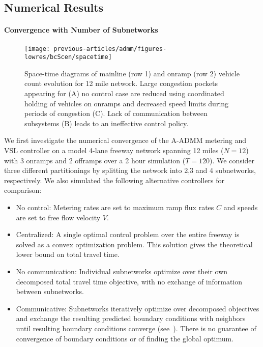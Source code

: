 \subsection{Numerical Results}
\label{sec:numerical_results-admm}

\paragraph{Convergence with Number of Subnetworks}

\begin{figure}[t]
  \centering
  \texttt{[image: previous-articles/admm/figures-lowres/bcScen/spacetime]}
  \caption{Space-time diagrams of mainline (row 1) and onramp (row 2) vehicle count evolution for 12 mile network. Large congestion pockets appearing for (A) no control case are reduced using coordinated holding of vehicles on onramps and decreased speed limits during periods of congestion (C). Lack of communication between subsystems (B) leads to an ineffective control policy.}
  \label{fig:spacetime}
\end{figure}

We first investigate the numerical convergence of the A-ADMM metering and VSL controller on a model 4-lane freeway network spanning 12 miles ($N=12$) with 3 onramps and 2 offramps over a 2 hour simulation ($T=120$). We consider three different partitionings by splitting the network into 2,3 and 4 subnetworks, respectively. We also simulated the following alternative controllers for comparison:

\begin{itemize}
  \item No control: Metering rates are set to maximum ramp flux rates $C$ and speeds are set to free flow velocity $V$.
  \item Centralized: A single optimal control problem over the entire freeway is solved as a convex optimization problem. This solution gives the theoretical lower bound on total travel time.
  \item No communication: Individual subnetworks optimize over their own decomposed total travel time objective, with no exchange of information between subnetworks.
  \item Communicative: Subnetworks iteratively optimize over decomposed objectives and exchange the resulting predicted boundary conditions with neighbors until resulting boundary conditions converge (see~\cite{Frejo2011Feasible}). There is no guarantee of convergence of boundary conditions or of finding the global optimum.
\end{itemize}

